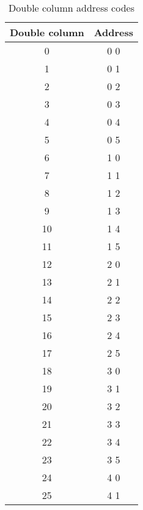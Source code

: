 \begin{table}[p]
\caption{Double column address codes}
{\footnotesize
    \begin{center}
\begin{tabular}{cc}
	\toprule
	Double column & Address \\
	\midrule
	0   &	0   0	\\
	1   &	0   1	\\
	2   &	0   2	\\
	3   &	0   3	\\
	4   &	0   4	\\
	5   &	0   5	\\
	6   &	1   0	\\
	7   &	1   1	\\
	8   &	1   2	\\
	9   &	1   3	\\
	10  &	1   4	\\
	11  &	1   5	\\
	12  &	2   0	\\
	13  &	2   1	\\
	14  &	2   2	\\
	15  &	2   3	\\
	16  &	2   4	\\
	17  &	2   5	\\
	18  &	3   0	\\
	19  &	3   1	\\
	20  &	3   2	\\
	21  &	3   3	\\
	22  &	3   4	\\
	23  &	3   5	\\
	24  &	4   0	\\
	25  &	4   1	\\
	\bottomrule
 \end{tabular}
    \end{center}
}
 \label{tab:columnaddr}
 \end{table}

